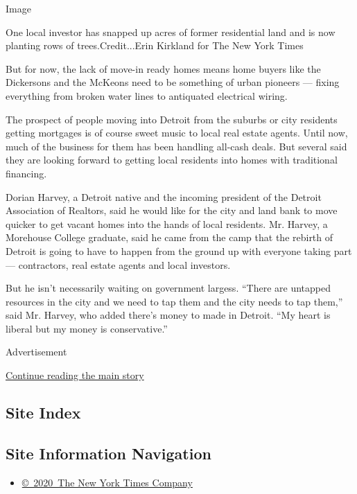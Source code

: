 Image

One local investor has snapped up acres of former residential land and
is now planting rows of trees.Credit...Erin Kirkland for The New York
Times

But for now, the lack of move-in ready homes means home buyers like the
Dickersons and the McKeons need to be something of urban pioneers ---
fixing everything from broken water lines to antiquated electrical
wiring.

The prospect of people moving into Detroit from the suburbs or city
residents getting mortgages is of course sweet music to local real
estate agents. Until now, much of the business for them has been
handling all-cash deals. But several said they are looking forward to
getting local residents into homes with traditional financing.

Dorian Harvey, a Detroit native and the incoming president of the
Detroit Association of Realtors, said he would like for the city and
land bank to move quicker to get vacant homes into the hands of local
residents. Mr. Harvey, a Morehouse College graduate, said he came from
the camp that the rebirth of Detroit is going to have to happen from the
ground up with everyone taking part --- contractors, real estate agents
and local investors.

But he isn't necessarily waiting on government largess. ``There are
untapped resources in the city and we need to tap them and the city
needs to tap them,'' said Mr. Harvey, who added there's money to made in
Detroit. ``My heart is liberal but my money is conservative.''

Advertisement

\protect\hyperlink{after-bottom}{Continue reading the main story}

\hypertarget{site-index}{%
\subsection{Site Index}\label{site-index}}

\hypertarget{site-information-navigation}{%
\subsection{Site Information
Navigation}\label{site-information-navigation}}

\begin{itemize}
\tightlist
\item
  \href{https://help.nytimes.com/hc/en-us/articles/115014792127-Copyright-notice}{©~2020~The
  New York Times Company}
\end{itemize}

